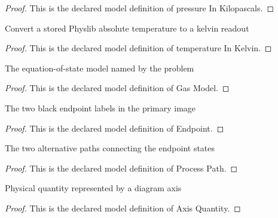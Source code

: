 \begin{proof}
  This is the declared model definition of pressure In Kilopascals.
\end{proof}
\begin{definition}
  \label{def:physics:phyx-mini-0370:phyxminiproblems-problemphyxmini0370-temperatureinkelvin}
  Convert a stored Physlib absolute temperature to a kelvin readout
\end{definition}
\begin{proof}
  This is the declared model definition of temperature In Kelvin.
\end{proof}
\begin{definition}
  \label{def:physics:phyx-mini-0370:phyxminiproblems-problemphyxmini0370-gasmodel}
  The equation-of-state model named by the problem
\end{definition}
\begin{proof}
  This is the declared model definition of Gas Model.
\end{proof}
\begin{definition}[Endpoint]
  \label{def:physics:phyx-mini-0370:phyxminiproblems-problemphyxmini0370-endpoint}
  The two black endpoint labels in the primary image
\end{definition}
\begin{proof}
  This is the declared model definition of Endpoint.
\end{proof}
\begin{definition}
  \label{def:physics:phyx-mini-0370:phyxminiproblems-problemphyxmini0370-processpath}
  The two alternative paths connecting the endpoint states
\end{definition}
\begin{proof}
  This is the declared model definition of Process Path.
\end{proof}
\begin{definition}
  \label{def:physics:phyx-mini-0370:phyxminiproblems-problemphyxmini0370-axisquantity}
  Physical quantity represented by a diagram axis
\end{definition}
\begin{proof}
  This is the declared model definition of Axis Quantity.
\end{proof}
